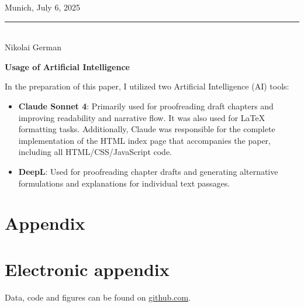 \documentclass[12pt]{article}
\theoremstyle{definition}
\begin{document}
\vspace{1cm}
Munich, July 6, 2025

\vspace{3cm}

\noindent\rule{0.5\textwidth}{0.4pt} \\
Nikolai German

\newpage



\Large
\noindent
\textbf{Usage of Artificial Intelligence} 
\vspace{0.5cm}
\noindent
\normalsize

In the preparation of this paper, I utilized two Artificial Intelligence (AI) tools:

\begin{itemize}
    \item \textbf{Claude Sonnet 4}: Primarily used for proofreading draft chapters and improving readability and narrative flow. It was also used for LaTeX formatting tasks. Additionally, Claude was responsible for the complete implementation of the HTML index page that accompanies the paper, including all HTML/CSS/JavaScript code.
    
    \item \textbf{DeepL}: Used for proofreading chapter drafts and generating alternative formulations and explanations for individual text passages.
\end{itemize}


\newpage

    

\setcounter{page}{1} %

\appendix

\section{Appendix}
\label{app}

\newpage


\section{Electronic appendix}
\label{el_app}

Data, code and figures can be found on \href{https://github.com/NikoGerman/Seminar}{\color{blue}github.com}.
\end{document}
